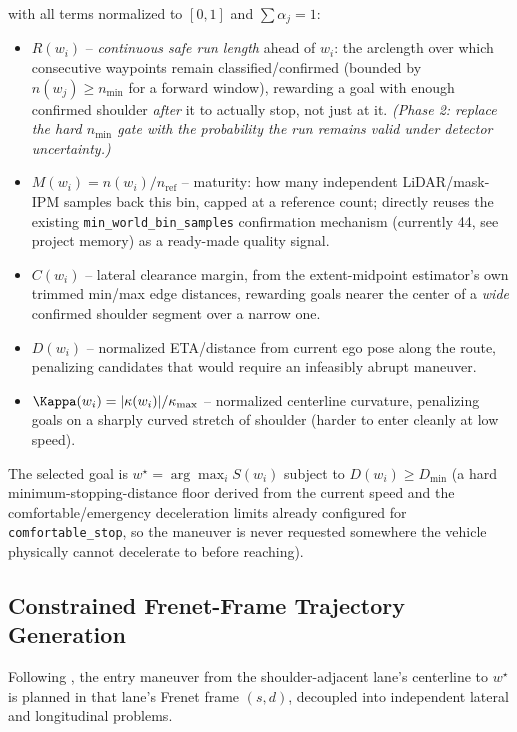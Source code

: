 \documentclass[11pt]{article}
\newcommand{\code}[1]{\texttt{#1}}
\begin{document}
with all terms normalized to $[0,1]$ and $\sum \alpha_j = 1$:
\begin{itemize}[leftmargin=1.6em]
  \item $R(w_i)$ -- \emph{continuous safe run length} ahead of $w_i$: the arclength over which
  consecutive waypoints remain classified/confirmed (bounded by $n(w_j) \geq
  n_{\min}$ for a forward window), rewarding a goal with enough confirmed shoulder \emph{after} it
  to actually stop, not just at it. \emph{(Phase 2: replace the hard $n_{\min}$ gate with the
  probability the run remains valid under detector uncertainty.)}
  \item $M(w_i) = n(w_i) / n_{\text{ref}}$ -- maturity: how many independent LiDAR/mask-IPM samples
  back this bin, capped at a reference count; directly reuses the existing
  \code{min\_world\_bin\_samples} confirmation mechanism (currently 44, see project memory) as a
  ready-made quality signal.
  \item $C(w_i)$ -- lateral clearance margin, from the extent-midpoint estimator's own trimmed
  min/max edge distances, rewarding goals nearer the center of a \emph{wide} confirmed shoulder
  segment over a narrow one.
  \item $D(w_i)$ -- normalized ETA/distance from current ego pose along the route, penalizing
  candidates that would require an infeasibly abrupt maneuver.
  \item $\Kappa(w_i) = |\kappa(w_i)| / \kappa_{\max}$ -- normalized centerline curvature, penalizing
  goals on a sharply curved stretch of shoulder (harder to enter cleanly at low speed).
\end{itemize}
The selected goal is $w^\star = \arg\max_i S(w_i)$ subject to $D(w_i) \geq D_{\min}$ (a hard
minimum-stopping-distance floor derived from the current speed and the comfortable/emergency
deceleration limits already configured for \code{comfortable\_stop}, so the maneuver is never
requested somewhere the vehicle physically cannot decelerate to before reaching).

\subsection{Constrained Frenet-Frame Trajectory Generation}
\label{sec:math_frenet}
Following \cite{werling2010frenet,werling2011manifolds}, the entry maneuver from the
shoulder-adjacent lane's centerline to $w^\star$ is planned in that lane's Frenet frame
$(s, d)$, decoupled into independent lateral and longitudinal problems.
\end{document}
